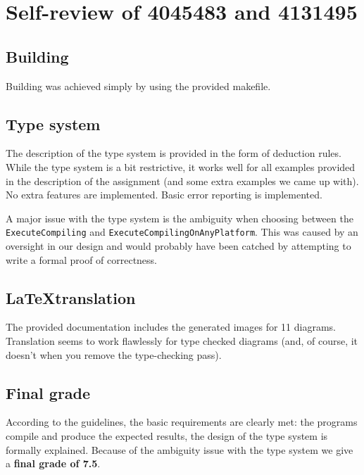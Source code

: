 \documentclass{article}
\begin{document}
	\section{Self-review of 4045483 and 4131495}
	
	\subsection{Building}
	
	Building was achieved simply by using the provided makefile.
	
	\subsection{Type system}
	
	The description of the type system is provided in the form of deduction rules. While the type system is a bit restrictive, it works well for all examples provided in the description of the assignment (and some extra examples we came up with). No extra features are implemented. Basic error reporting is implemented.
	
	A major issue with the type system is the ambiguity when choosing between the \texttt{ExecuteCompiling} and \texttt{ExecuteCompilingOnAnyPlatform}. This was caused by an oversight in our design and would probably have been catched by attempting to write a formal proof of correctness.
	
	\subsection{\LaTeX translation}
	
	The provided documentation includes the generated images for 11 diagrams. Translation seems to work flawlessly for type checked diagrams (and, of course, it doesn't when you remove the type-checking pass).
	
	\subsection{Final grade}
	
	According to the guidelines, the basic requirements are clearly met: the programs compile and produce the expected results, the design of the type system is formally explained. Because of the ambiguity issue with the type system we give a \textbf{final grade of 7.5}.
	
\end{document}

